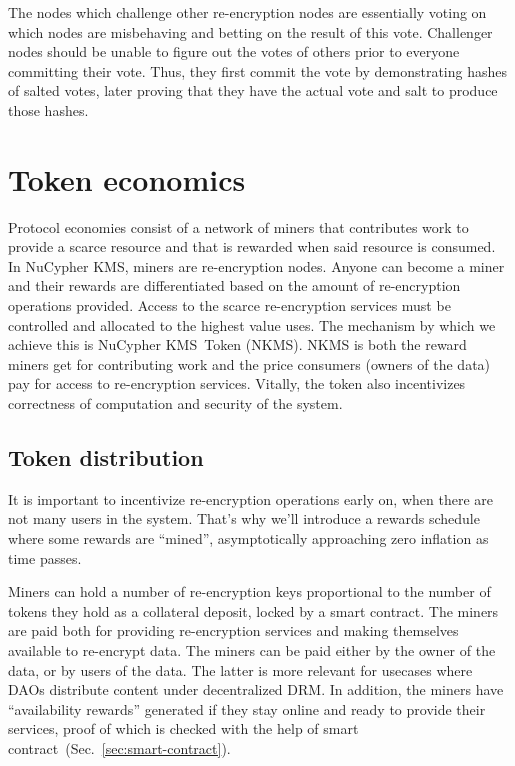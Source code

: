 \documentclass[longbibliography,nofootinbib]{revtex4-1}
\newcommand{\kms}{NuCypher KMS}
\begin{document}
The nodes which challenge other re-encryption nodes are essentially voting on which nodes are misbehaving and betting on the result of this vote.
Challenger nodes should be unable to figure out the votes of others prior to everyone committing their vote.
Thus, they first commit the vote by demonstrating hashes of salted votes, later proving that they have the actual vote and salt to produce those hashes.

\section{Token economics}
\label{sec:token}

Protocol economies consist of a network of miners that contributes work to provide a scarce resource and that is
rewarded when said resource is consumed.
In \kms, miners are re-encryption nodes.
Anyone can become a miner and their rewards are differentiated based on the amount of re-encryption operations provided.
Access to the scarce re-encryption services must be controlled and allocated to the highest value uses.
The mechanism by which we achieve this is \kms~Token (NKMS).
NKMS is both the reward miners get for contributing work and the price consumers (owners of the data) pay for access to re-encryption services.
Vitally, the token also incentivizes correctness of computation and security of the system.

\subsection{Token distribution}

It is important to incentivize re-encryption operations early on, when there are not many users in the system.
That's why we'll introduce a rewards schedule where some rewards are ``mined'', asymptotically approaching zero inflation as time passes.

Miners can hold a number of re-encryption keys proportional to the number of tokens they hold as a collateral deposit, locked by a smart contract.
The miners are paid both for providing re-encryption services and making themselves available to re-encrypt data.
The miners can be paid either by the owner of the data, or by users of the data.
The latter is more relevant for usecases where DAOs distribute content under decentralized DRM.
In addition, the miners have ``availability rewards'' generated if they stay online and ready to provide their services, proof of which is checked with the help of
smart contract~(Sec.~\ref{sec:smart-contract}).
\end{document}
